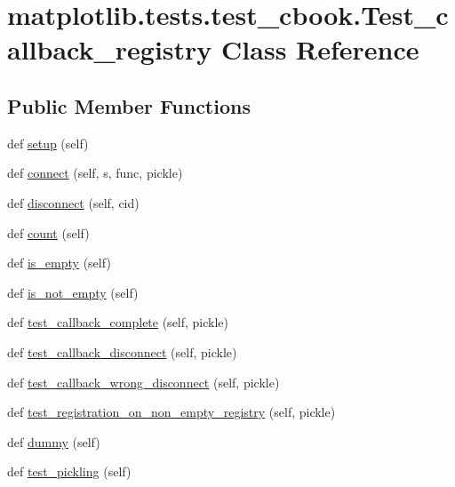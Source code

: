 \hypertarget{classmatplotlib_1_1tests_1_1test__cbook_1_1Test__callback__registry}{}\section{matplotlib.\+tests.\+test\+\_\+cbook.\+Test\+\_\+callback\+\_\+registry Class Reference}
\label{classmatplotlib_1_1tests_1_1test__cbook_1_1Test__callback__registry}
\subsection*{Public Member Functions}
\begin{DoxyCompactItemize}
\item 
def \hyperlink{classmatplotlib_1_1tests_1_1test__cbook_1_1Test__callback__registry_a1a38a16ee200d08f16acbe9b0b85a0d6}{setup} (self)
\item 
def \hyperlink{classmatplotlib_1_1tests_1_1test__cbook_1_1Test__callback__registry_a24545f5f5123d92add731a842e7fe8cb}{connect} (self, s, func, pickle)
\item 
def \hyperlink{classmatplotlib_1_1tests_1_1test__cbook_1_1Test__callback__registry_a5f82511914e06c289d173286bc56a6a4}{disconnect} (self, cid)
\item 
def \hyperlink{classmatplotlib_1_1tests_1_1test__cbook_1_1Test__callback__registry_a196e4c203ff494f40045620b44b07f89}{count} (self)
\item 
def \hyperlink{classmatplotlib_1_1tests_1_1test__cbook_1_1Test__callback__registry_ad85fb8677a79ce48cdde77ad3a3d7ee6}{is\+\_\+empty} (self)
\item 
def \hyperlink{classmatplotlib_1_1tests_1_1test__cbook_1_1Test__callback__registry_ae700fdb1fa2dc409277768d64b1a7f1d}{is\+\_\+not\+\_\+empty} (self)
\item 
def \hyperlink{classmatplotlib_1_1tests_1_1test__cbook_1_1Test__callback__registry_a95bd182c7e7ae61fd9b93c7349eda3f5}{test\+\_\+callback\+\_\+complete} (self, pickle)
\item 
def \hyperlink{classmatplotlib_1_1tests_1_1test__cbook_1_1Test__callback__registry_a882353f11ba40b869216daa146f79460}{test\+\_\+callback\+\_\+disconnect} (self, pickle)
\item 
def \hyperlink{classmatplotlib_1_1tests_1_1test__cbook_1_1Test__callback__registry_a79f3db05d1900a889ff59433dafd8a4f}{test\+\_\+callback\+\_\+wrong\+\_\+disconnect} (self, pickle)
\item 
def \hyperlink{classmatplotlib_1_1tests_1_1test__cbook_1_1Test__callback__registry_ace47fbec281be254317cf1d93072ed06}{test\+\_\+registration\+\_\+on\+\_\+non\+\_\+empty\+\_\+registry} (self, pickle)
\item 
def \hyperlink{classmatplotlib_1_1tests_1_1test__cbook_1_1Test__callback__registry_a32e99a5b221244c93da4bbe797ba4108}{dummy} (self)
\item 
def \hyperlink{classmatplotlib_1_1tests_1_1test__cbook_1_1Test__callback__registry_a2abbec526f99b8b0068365b9f4dcf09e}{test\+\_\+pickling} (self)
\end{DoxyCompactItemize}
